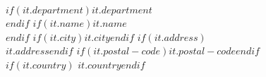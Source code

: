 $if(it.department)$$it.department$\\$endif$
$if(it.name)$\textit{$it.name$}\\$endif$
$if(it.city)$$it.city$$endif$ $if(it.address)$\\$it.address$$endif$ $if(it.postal-code)$$it.postal-code$$endif$\\
$if(it.country)$ $it.country$$endif$

